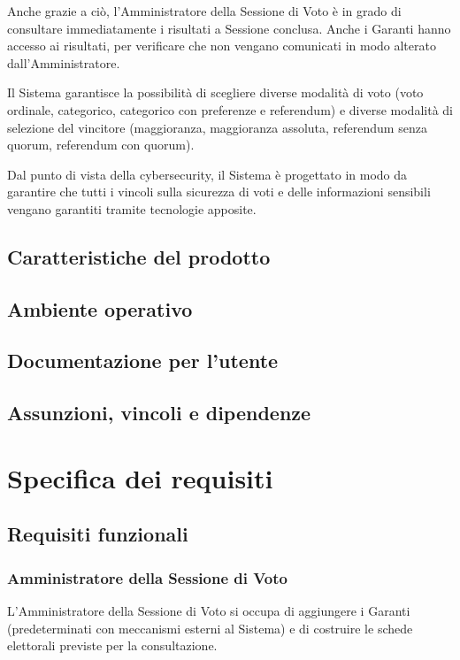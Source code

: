 \documentclass{report}
\begin{document}
Anche grazie a ciò, l'Amministratore della Sessione di Voto è in grado di consultare immediatamente i risultati a Sessione conclusa. Anche i Garanti hanno accesso ai risultati, per verificare che non vengano comunicati in modo alterato dall'Amministratore.

Il Sistema garantisce la possibilità di scegliere diverse modalità di voto (voto ordinale, categorico, categorico con preferenze e referendum) e diverse modalità di selezione del vincitore (maggioranza, maggioranza assoluta, referendum senza quorum, referendum con quorum).

Dal punto di vista della cybersecurity, il Sistema è progettato in modo da garantire che tutti i vincoli sulla sicurezza di voti e delle informazioni sensibili vengano garantiti tramite tecnologie apposite.


\section{Caratteristiche del prodotto}




\section{Ambiente operativo}




\section{Documentazione per l'utente}




\section{Assunzioni, vincoli e dipendenze}






\chapter{Specifica dei requisiti}




\section{Requisiti funzionali}


\subsection{Amministratore della Sessione di Voto}
L'Amministratore della Sessione di Voto si occupa di aggiungere i Garanti (predeterminati con meccanismi esterni al Sistema) e di costruire le schede elettorali previste per la consultazione.
\end{document}
